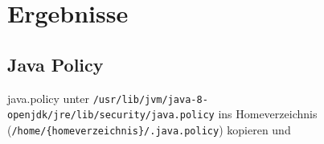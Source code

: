 
\section{Ergebnisse}
\label{sec:Ergebnisse}

\subsection{Java Policy}

java.policy unter \texttt{/usr/lib/jvm/java-8-openjdk/jre/lib/security/java.policy} ins Homeverzeichnis (\texttt{/home/\{homeverzeichnis\}/.java.policy}) kopieren und 